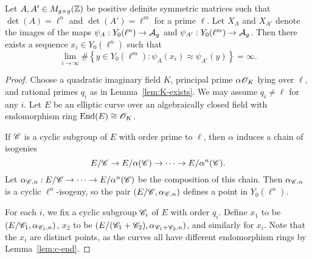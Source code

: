 \documentclass{amsart}
\begin{document}
\begin{lemma}\label{lem:lim-degree}
  Let $A,A' \in M_{g \times g}(\mathbb{Z})$ be positive definite symmetric matrices such that $\det(A) = \ell^n$ and $\det(A') = \ell^m$ for a prime $\ell$. Let $X_A$ and $X_{A'}$ denote the images of the maps $\psi_A: Y_0(\ell^n) \to \mathcal{A}_g$ and $\psi_{A'}: Y_0(\ell^m) \to \mathcal{A}_g$. Then there exists a sequence $x_i \in Y_0(\ell^n)$ such that
  \[
    \lim_{i \to \infty}\#\left\{ y \in Y_0(\ell^m) \colon \psi_A(x_i) \approx \psi_{A'}(y) \right\} = \infty.
  \]
\end{lemma}
\begin{proof}
  Choose a quadratic imaginary field $K$, principal prime $\alpha\mathscr{O}_K$ lying over $\ell$, and rational primes $q_i$ as in Lemma~\ref{lem:K-exists}. We may assume $q_i \neq \ell$ for any $i$. Let $E$ be an elliptic curve over an algebraically closed field with endomorphism ring $\operatorname{End}(E) \cong \mathscr{O}_K$.

  If $\mathscr{C}$ is a cyclic subgroup of $E$ with order prime to $\ell$, then $\alpha$ induces a chain of isogenies
  \[
    E/\mathscr{C} \to E/\alpha(\mathscr{C}) \to \cdots \to E/\alpha^n(\mathscr{C}).
  \]
  Let $\alpha_{\mathscr{C},n}: E/\mathscr{C} \to \cdots \to E/\alpha^n(\mathscr{C})$ be the composition of this chain. Then $\alpha_{\mathscr{C},n}$ is a cyclic $\ell^n$-isogeny, so the pair $(E/\mathscr{C},\alpha_{\mathscr{C},n})$ defines a point in $Y_0(\ell^n)$.

    For each $i$, we fix a cyclic subgroup $\mathscr{C}_i$ of $E$ with order $q_i$. Define $x_1$ to be $(E/\mathscr{C}_1,\alpha_{\mathscr{C}_1,n})$, $x_2$ to be $(E/(\mathscr{C}_1 + \mathscr{C}_2), \alpha_{\mathscr{C}_1 + \mathscr{C}_2,n})$, and similarly for $x_i$. Note that the $x_i$ are distinct points, as the curves all have different endomorphism rings by Lemma~\ref{lem:c-end}.


\end{proof}
\end{document}
